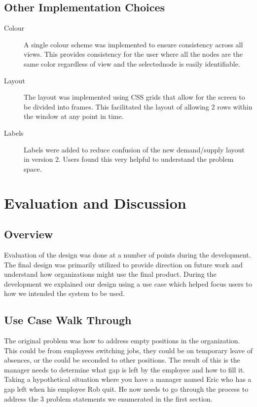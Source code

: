 \documentclass[journal]{vgtc}                %
\begin{document}
\subsection{Other Implementation Choices}

\begin{description}
\item [Colour] A single colour scheme was implemented to ensure consistency across all views.  This provides consistency for the user where all the nodes are the same color regardless of view and the selectednode is easily identifiable.
\item[Layout] The layout was implemented using CSS grids that allow for the screen to be divided into frames.  This facilitated the layout of allowing 2 rows within the window at any point in time.
\item[Labels] Labels were added to reduce confusion of the new demand/supply layout in version 2.  Users found this very helpful to understand the problem space.
\end{description}

\section{Evaluation and Discussion}
\label{sec:evaldiscuss}

\subsection{Overview}
Evaluation of the design was done at a number of points during the development.  The final design was primarily utilized to provide direction on future work and understand how organizations might use the final product.  During the development we explained our design using a use case which helped focus users to how we intended the system to be used.

\subsection{Use Case Walk Through}
The original problem was how to address empty positions in the organization.  This could be from employees switching jobs, they could be on temporary leave of absences, or the could be seconded to other positions.  The result of this is the manager needs to determine what gap is left by the employee and how to fill it.  Taking a hypothetical situation where you have a manager named Eric who has a gap left when his employee Rob quit.  He now needs to go through the process to address the 3 problem statements we enumerated in the first section.
\end{document}
